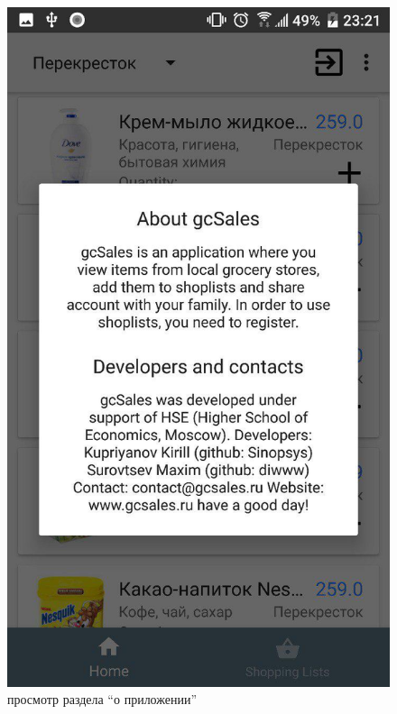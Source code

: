 \begin{figure}[h!]
    \centering
    \includegraphics[height=0.35\textheight]{./screenshots/3/about.jpg}
    \caption{\small{просмотр раздела ``о приложении''}}
    \label{about}
    \endminipage\hfill

\end{figure}
